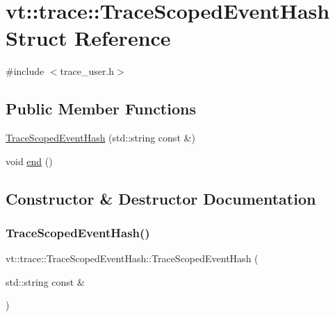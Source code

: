 \hypertarget{structvt_1_1trace_1_1_trace_scoped_event_hash}{}\section{vt\+:\+:trace\+:\+:Trace\+Scoped\+Event\+Hash Struct Reference}
\label{structvt_1_1trace_1_1_trace_scoped_event_hash}


{\ttfamily \#include $<$trace\+\_\+user.\+h$>$}

\subsection*{Public Member Functions}
\begin{DoxyCompactItemize}
\item 
\hyperlink{structvt_1_1trace_1_1_trace_scoped_event_hash_a47bf49378624ed567d669457a0cedef0}{Trace\+Scoped\+Event\+Hash} (std\+::string const \&)
\item 
void \hyperlink{structvt_1_1trace_1_1_trace_scoped_event_hash_ae9d589c131c9fbb66b1a1f32304d661f}{end} ()
\end{DoxyCompactItemize}


\subsection{Constructor \& Destructor Documentation}
\mbox{\label{structvt_1_1trace_1_1_trace_scoped_event_hash_a47bf49378624ed567d669457a0cedef0}} 
\subsubsection{\texorpdfstring{Trace\+Scoped\+Event\+Hash()}{TraceScopedEventHash()}}
{\footnotesize\ttfamily vt\+::trace\+::\+Trace\+Scoped\+Event\+Hash\+::\+Trace\+Scoped\+Event\+Hash (\begin{DoxyParamCaption}\item[{std\+::string const \&}]{ }\end{DoxyParamCaption})\hspace{0.3cm}{\ttfamily [inline]}}



